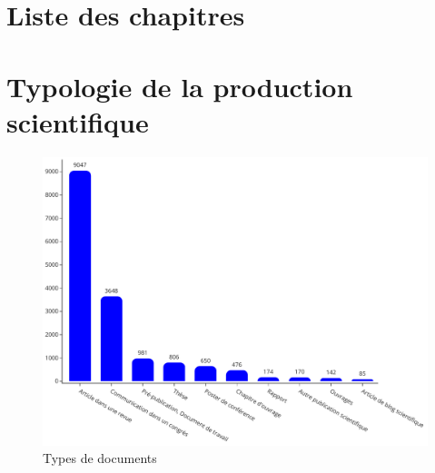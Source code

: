 \documentclass[french, 11pt]{dibiso/biso}
\begin{document}







\pagebreak

\section{Liste des chapitres}

{
  \footnotesize
  
}







\pagebreak

\section{Typologie de la production scientifique}

\begin{figure}[!h]
  \includegraphics[width=\textwidth]{figures/works_type.pdf}
  \centering
  \caption{Types de documents}
  \label{fig_doc_type}
\end{figure}

\end{document}
